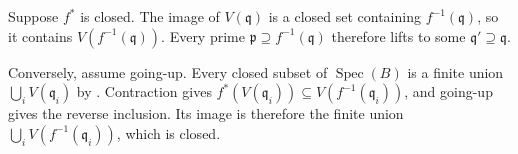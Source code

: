 Suppose $f^*$ is closed. The image of $V(\mathfrak q)$ is a closed set containing $f^{-1}(\mathfrak q)$, so it contains $V(f^{-1}(\mathfrak q))$. Every prime $\mathfrak p\supseteq f^{-1}(\mathfrak q)$ therefore lifts to some $\mathfrak q'\supseteq\mathfrak q$.

Conversely, assume going-up. Every closed subset of $\operatorname{Spec}(B)$ is a finite union $\bigcup_iV(\mathfrak q_i)$ by . Contraction gives $f^*(V(\mathfrak q_i))\subseteq V(f^{-1}(\mathfrak q_i))$, and going-up gives the reverse inclusion. Its image is therefore the finite union $\bigcup_iV(f^{-1}(\mathfrak q_i))$, which is closed.
